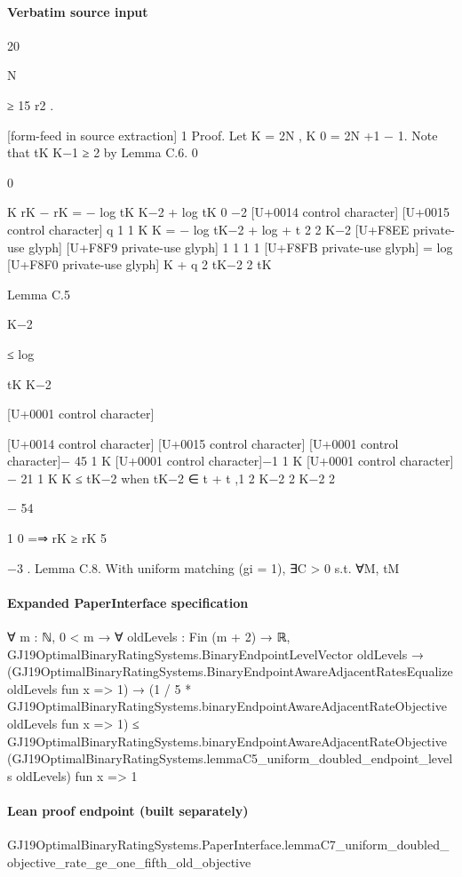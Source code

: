 \documentclass[10pt]{article}
\begin{document}
\paragraph{Verbatim source input}
\begin{ReviewVerbatim}
20

N

≥ 15 r2 .


[form-feed in source extraction]
1
Proof. Let K = 2N , K 0 = 2N +1 − 1. Note that tK
K−1 ≥ 2 by Lemma C.6.
0

0

K
rK − rK = − log tK
K−2 + log tK 0 −2
[U+0014 control character]
[U+0015 control character]
q
1 1 K
K
= − log tK−2 + log
+
t
2 2 K−2
[U+F8EE private-use glyph]
[U+F8F9 private-use glyph]
1
1
1
1
[U+F8FB private-use glyph]
= log [U+F8F0 private-use glyph] K + q
2 tK−2 2 tK

Lemma C.5

K−2

≤ log

tK
K−2

[U+0001 control character]

[U+0014 control character]
[U+0015 control character]
[U+0001 control character]− 45
1 K [U+0001 control character]−1 1 K [U+0001 control character]− 21
1
K
K
≤ tK−2
when tK−2 ∈
t
+
t
,1
2 K−2
2 K−2
2

− 54

1
0
=⇒ rK ≥ rK
5

−3 .
Lemma C.8. With uniform matching (gi = 1), ∃C > 0 s.t. ∀M, tM
\end{ReviewVerbatim}


\paragraph{Expanded PaperInterface specification}
\begin{ReviewVerbatim}
∀ {m : ℕ},
  0 < m →
    ∀ {oldLevels : Fin (m + 2) → ℝ},
      GJ19OptimalBinaryRatingSystems.BinaryEndpointLevelVector oldLevels →
        (GJ19OptimalBinaryRatingSystems.BinaryEndpointAwareAdjacentRatesEqualize oldLevels fun x => 1) →
          (1 / 5 * GJ19OptimalBinaryRatingSystems.binaryEndpointAwareAdjacentRateObjective oldLevels fun x => 1) ≤
            GJ19OptimalBinaryRatingSystems.binaryEndpointAwareAdjacentRateObjective
              (GJ19OptimalBinaryRatingSystems.lemmaC5_uniform_doubled_endpoint_levels oldLevels) fun x => 1
\end{ReviewVerbatim}

\paragraph{Lean proof endpoint (built separately)}\begin{ReviewVerbatim}
GJ19OptimalBinaryRatingSystems.PaperInterface.lemmaC7_uniform_doubled_objective_rate_ge_one_fifth_old_objective
\end{ReviewVerbatim}
\end{document}
